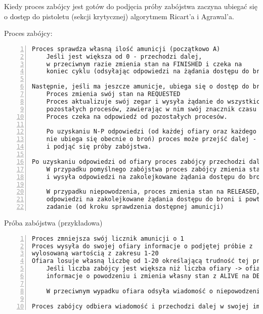 \documentclass[11pt]{article}
\begin{document}
Kiedy proces zabójcy jest gotów do podjęcia próby zabójstwa zaczyna ubiegać się o dostęp do pistoletu (sekcji krytycznej) algorytmem Ricart'a i Agrawal'a.

Proces zabójcy:
\begin{Verbatim}[numbers=left,xleftmargin=5mm]
Proces sprawdza własną ilość amunicji (początkowo A)
    Jeśli jest większa od 0 - przechodzi dalej, 
    w przeciwnym razie zmienia stan na FINISHED i czeka na 
    koniec cyklu (odsyłając odpowiedzi na żądania dostępu do broni).

Następnie, jeśli ma jeszcze amunicje, ubiega się o dostęp do broni:
    Proces zmienia swój stan na REQUESTED
    Proces aktualizuje swój zegar i wysyła żądanie do wszystkich 
    pozostałych procesów, zawierając w nim swój znacznik czasu
    Proces czeka na odpowiedź od pozostałych procesów.

    Po uzyskaniu N-P odpowiedzi (od każdej ofiary oraz każdego zabójcy który
    nie ubiega się obecnie o broń) proces może przejść dalej - zabrać broń
    i podjąć się próby zabójstwa.

Po uzyskaniu odpowiedzi od ofiary proces zabójcy przechodzi dalej:
    W przypadku pomyślnego zabójstwa proces zabójcy zmienia stan na FINISHED
    i wysyła odpowiedzi na zakolejkowane żądania dostępu do broni.

    W przypadku niepowodzenia, proces zmienia stan na RELEASED, wysyła
    odpowiedzi na zakolejkowane żądania dostępu do broni i powtarza swoje
    zadanie (od kroku sprawdzenia dostępnej amunicji)

\end{Verbatim}

Próba zabójstwa (przykładowa)
\begin{Verbatim}[numbers=left,xleftmargin=5mm]
Proces zmniejsza swój licznik amunicji o 1
Proces wysyła do swojej ofiary informacje o podjętej próbie z
wylosowaną wartością z zakresu 1-20
Ofiara losuje własną liczbę od 1-20 określającą trudność tej próby
    Jeśli liczba zabójcy jest większa niż liczba ofiary -> ofiara przesyła
    informacje o powodzeniu i zmienia własny stan z ALIVE na DEAD

    W przeciwnym wypadku ofiara odsyła wiadomość o niepowodzeniu.

Proces zabójcy odbiera wiadomość i przechodzi dalej w swojej implementacji
\end{Verbatim}

\newpage
\end{document}
